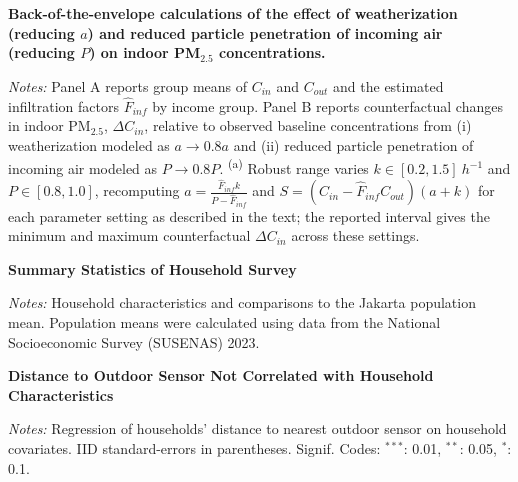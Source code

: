 \documentclass[9pt,twoside]{pnas-new}
\begin{document}
\begin{adjustwidth}{1cm}{1cm}
\pagebreak 
\newpage

\begin{table}[!h] %
    \centering

    \caption{\textbf{Back-of-the-envelope calculations of the effect of weatherization (reducing $a$) and reduced particle penetration of incoming air (reducing $P$) on indoor PM$_{2.5}$ concentrations.}}
    \label{SI_BoE_table}
    \begin{adjustbox}{max width=0.9\textwidth}
    \small
    
    \end{adjustbox}
    \caption*{\footnotesize \textit{Notes:} Panel A reports group means of $C_{in}$ and $C_{out}$ and the estimated infiltration factors $\hat F_{inf}$ by income group. Panel B reports counterfactual changes in indoor PM$_{2.5}$, $\Delta C_{in}$, relative to observed baseline concentrations from (i) weatherization modeled as $a \rightarrow 0.8a$ and (ii) reduced particle penetration of incoming air modeled as $P \rightarrow 0.8P$. \textsuperscript{(a)} Robust range varies $k \in [0.2,1.5]~h^{-1}$ and $P \in [0.8,1.0]$, recomputing $a=\frac{\hat F_{inf}k}{P-\hat F_{inf}}$ and $S=(C_{in}-\hat F_{inf}C_{out})(a+k)$ for each parameter setting as described in the text; the reported interval gives the minimum and maximum counterfactual $\Delta C_{in}$ across these settings.}
\end{table}

\newpage

\begin{table}[!h] %
    \centering

    \caption{\textbf{Summary Statistics of Household Survey}}
    \label{tab:covariates}
    \begin{adjustbox}{max width=.7\textwidth}
    \small
    
    \end{adjustbox}
    \caption*{\footnotesize \textit{Notes:}  Household characteristics and comparisons to the Jakarta population mean. Population means were calculated using data from the National Socioeconomic Survey (SUSENAS) 2023.}
\end{table}


\begin{table}[!h] %

    \centering

    \caption{\textbf{Distance to Outdoor Sensor Not Correlated with Household Characteristics}}
    \label{tab:sensor_selection}
    \begin{adjustbox}{max width=.7\textwidth}
    \small
    
    \end{adjustbox}
    \caption*{\footnotesize \textit{Notes:} Regression of households' distance to nearest outdoor sensor on household covariates. IID standard-errors in parentheses. Signif. Codes: $^{***}$: 0.01, $^{**}$: 0.05, $^{*}$: 0.1.}
\end{table}






\pagebreak
\clearpage 

% 


\end{adjustwidth}
\end{document}
